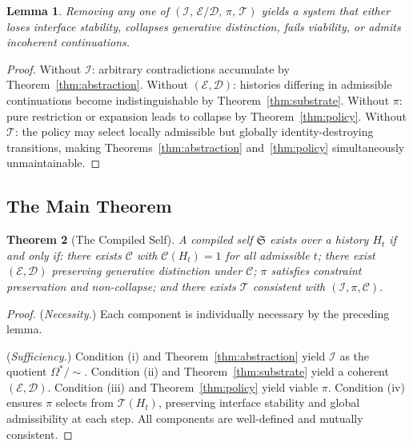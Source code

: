 \documentclass[12pt, a4paper]{article}
\theoremstyle{plain}
\newtheorem{theorem}{Theorem}[section]
\newtheorem{lemma}[theorem]{Lemma}
\theoremstyle{definition}
\theoremstyle{remark}
\begin{document}
\begin{lemma}
Removing any one of $(\mathcal{I},\, \mathcal{E}/\mathcal{D},\, \pi,\, \mathcal{T})$ yields a system that either loses interface stability, collapses generative distinction, fails viability, or admits incoherent continuations.
\end{lemma}

\begin{proof}
Without $\mathcal{I}$: arbitrary contradictions accumulate by Theorem~\ref{thm:abstraction}. Without $(\mathcal{E},\mathcal{D})$: histories differing in admissible continuations become indistinguishable by Theorem~\ref{thm:substrate}. Without $\pi$: pure restriction or expansion leads to collapse by Theorem~\ref{thm:policy}. Without $\mathcal{T}$: the policy may select locally admissible but globally identity-destroying transitions, making Theorems~\ref{thm:abstraction} and~\ref{thm:policy} simultaneously unmaintainable.
\end{proof}

\subsection{The Main Theorem}

\begin{theorem}[The Compiled Self]
\label{thm:self}
A compiled self $\mathfrak{S}$ exists over a history $H_t$ if and only if: there exists $\mathcal{C}$ with $\mathcal{C}(H_t) = 1$ for all admissible $t$; there exist $(\mathcal{E}, \mathcal{D})$ preserving generative distinction under $\mathcal{C}$; $\pi$ satisfies constraint preservation and non-collapse; and there exists $\mathcal{T}$ consistent with $(\mathcal{I}, \pi, \mathcal{C})$.
\end{theorem}

\begin{proof}
(\textit{Necessity.}) Each component is individually necessary by the preceding lemma.

(\textit{Sufficiency.}) Condition (i) and Theorem~\ref{thm:abstraction} yield $\mathcal{I}$ as the quotient $\Omega^*/{\sim}$. Condition (ii) and Theorem~\ref{thm:substrate} yield a coherent $(\mathcal{E},\mathcal{D})$. Condition (iii) and Theorem~\ref{thm:policy} yield viable $\pi$. Condition (iv) ensures $\pi$ selects from $\mathcal{T}(H_t)$, preserving interface stability and global admissibility at each step. All components are well-defined and mutually consistent.
\end{proof}
\end{document}
